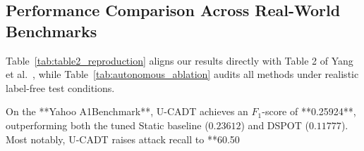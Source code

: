 \documentclass[conference]{IEEEtran}
\begin{document}
\begin{table}[t]
\centering
\caption{Empirical Audit: Autonomous Performance (No Oracle Feedback)}
\label{tab:autonomous_ablation}
\end{table}

\subsection{Performance Comparison Across Real-World Benchmarks}
Table~\ref{tab:table2_reproduction} aligns our results directly with Table 2 of Yang et al.~\cite{yang2023adt}, while Table~\ref{tab:autonomous_ablation} audits all methods under realistic label-free test conditions.

On the **Yahoo A1Benchmark**, U-CADT achieves an $F_1$-score of **0.25924**, outperforming both the tuned Static baseline ($0.23612$) and DSPOT ($0.11777$). Most notably, U-CADT raises attack recall to **60.50%
\end{document}
